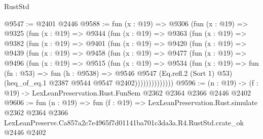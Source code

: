 \begin{lexlean}{RustStd}
\begin{coremodule}
@9547 := @2401 @2446
@9588 := fun (x : @19) =>
  @9306
    (fun (x : @19) =>
    @9325
      (fun (x : @19) =>
      @9344
        (fun (x : @19) =>
        @9363
          (fun (x : @19) =>
          @9382
            (fun (x : @19) =>
            @9401
              (fun (x : @19) =>
              @9420
                (fun (x : @19) =>
                @9439
                  (fun (x : @19) =>
                  @9458
                    (fun (x : @19) =>
                    @9477
                      (fun (x : @19) =>
                      @9496
                        (fun (x : @19) =>
                        @9515
                          (fun (x : @19) =>
                          @9534
                            (fun (x : @19) =>
                            fun (fn : @53) =>
                            fun (h : @9538) =>
                            @9546
                              @9547
                              (Eq.refl.{2} (Sort 1) @53)
                              (heq_of_eq.{1} @2387 @9544 @9547 @2402))))))))))))))
@9596 := (n : @19) -> (f : @19) -> LexLeanPreservation.Rust.FunSem @2362 @2364 @2366 @2446 @2402
@9606 := fun (n : @19) =>
  fun (f : @19) =>
  LexLeanPreservation.Rust.simulate
    @2362
    @2364
    @2366
    LexLeanPreserve.Ca857a2c7e4965f7d01141ba701c3da3a.R4.RustStd.crate_ok
    @2446
    @2402
\end{coremodule}
\end{lexlean}
